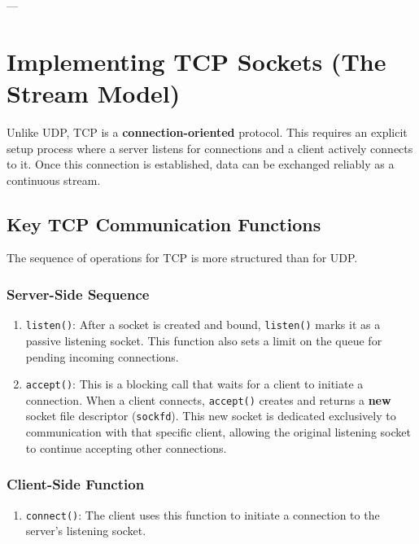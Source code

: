 \documentclass{article}
\begin{document}
---

\section[Implementing TCP Sockets]{Implementing TCP Sockets (The Stream Model)}

Unlike UDP, TCP is a \textbf{connection-oriented} protocol. This requires an explicit setup process where a server listens for connections and a client actively connects to it. Once this connection is established, data can be exchanged reliably as a continuous stream.

\subsection{Key TCP Communication Functions}

The sequence of operations for TCP is more structured than for UDP.

\subsubsection{Server-Side Sequence}

\begin{enumerate}
    \item \texttt{listen()}: After a socket is created and bound, \texttt{listen()} marks it as a passive listening socket. This function also sets a limit on the queue for pending incoming connections.
    \item \texttt{accept()}: This is a blocking call that waits for a client to initiate a connection. When a client connects, \texttt{accept()} creates and returns a \textbf{new} socket file descriptor (\texttt{sockfd}). This new socket is dedicated exclusively to communication with that specific client, allowing the original listening socket to continue accepting other connections.
\end{enumerate}

\subsubsection{Client-Side Function}

\begin{enumerate}
    \item \texttt{connect()}: The client uses this function to initiate a connection to the server's listening socket.
\end{enumerate}
\end{document}
